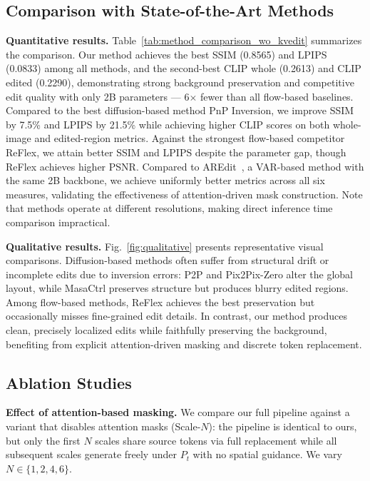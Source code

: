 \subsection{Comparison with State-of-the-Art Methods}

\noindent\textbf{Quantitative results.}
Table~\ref{tab:method_comparison_wo_kvedit} summarizes the comparison. Our method achieves the best SSIM (0.8565) and LPIPS (0.0833) among all methods, and the second-best CLIP whole (0.2613) and CLIP edited (0.2290), demonstrating strong background preservation and competitive edit quality with only 2B parameters — 6$\times$ fewer than all flow-based baselines. Compared to the best diffusion-based method PnP Inversion, we improve SSIM by 7.5\% and LPIPS by 21.5\% while achieving higher CLIP scores on both whole-image and edited-region metrics. Against the strongest flow-based competitor ReFlex, we attain better SSIM and LPIPS despite the parameter gap, though ReFlex achieves higher PSNR. Compared to AREdit~\cite{AREdit}, a VAR-based method with the same 2B backbone, we achieve uniformly better metrics across all six measures, validating the effectiveness of attention-driven mask construction. Note that methods operate at different resolutions, making direct inference time comparison impractical.



\noindent\textbf{Qualitative results.}
Fig.~\ref{fig:qualitative} presents representative visual comparisons. Diffusion-based methods often suffer from structural drift or incomplete edits due to inversion errors: P2P and Pix2Pix-Zero alter the global layout, while MasaCtrl preserves structure but produces blurry edited regions. Among flow-based methods, ReFlex achieves the best preservation but occasionally misses fine-grained edit details. In contrast, our method produces clean, precisely localized edits while faithfully preserving the background, benefiting from explicit attention-driven masking and discrete token replacement.


\subsection{Ablation Studies}
\label{sec:ablation}

\noindent\textbf{Effect of attention-based masking.}
We compare our full pipeline against a variant that disables attention masks (Scale-$N$): the pipeline is identical to ours, but only the first $N$ scales share source tokens via full replacement while all subsequent scales generate freely under $P_t$ with no spatial guidance. We vary $N \in \{1, 2, 4, 6\}$.

